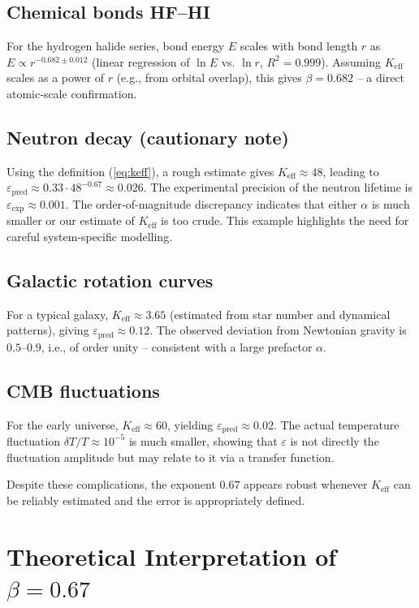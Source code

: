 \documentclass[12pt]{article}
\newcommand{\Keff}{K_{\mathrm{eff}}}
\newcommand{\eps}{\varepsilon}
\begin{document}
	\subsection*{Chemical bonds HF–HI}
	For the hydrogen halide series, bond energy \(E\) scales with bond length \(r\) as \(E \propto r^{-0.682 \pm 0.012}\) (linear regression of \(\ln E\) vs. \(\ln r\), \(R^2 = 0.999\)). Assuming \(\Keff\) scales as a power of \(r\) (e.g., from orbital overlap), this gives \(\beta = 0.682\) – a direct atomic‑scale confirmation.
	
	\subsection*{Neutron decay (cautionary note)}
	Using the definition (\ref{eq:keff}), a rough estimate gives \(\Keff \approx 48\), leading to \(\eps_{\text{pred}} \approx 0.33 \cdot 48^{-0.67} \approx 0.026\). The experimental precision of the neutron lifetime is \(\eps_{\text{exp}} \approx 0.001\). The order‑of‑magnitude discrepancy indicates that either \(\alpha\) is much smaller or our estimate of \(\Keff\) is too crude. This example highlights the need for careful system‑specific modelling.
	
	\subsection*{Galactic rotation curves}
	For a typical galaxy, \(\Keff \approx 3.65\) (estimated from star number and dynamical patterns), giving \(\eps_{\text{pred}} \approx 0.12\). The observed deviation from Newtonian gravity is \(0.5\)–\(0.9\), i.e., of order unity – consistent with a large prefactor \(\alpha\).
	
	\subsection*{CMB fluctuations}
	For the early universe, \(\Keff \approx 60\), yielding \(\eps_{\text{pred}} \approx 0.02\). The actual temperature fluctuation \(\delta T/T \approx 10^{-5}\) is much smaller, showing that \(\eps\) is not directly the fluctuation amplitude but may relate to it via a transfer function.
	
	Despite these complications, the exponent \(0.67\) appears robust whenever \(\Keff\) can be reliably estimated and the error is appropriately defined.
	
	\section{Theoretical Interpretation of \(\beta = 0.67\)}
	\label{sec:derivation}
	
\end{document}
